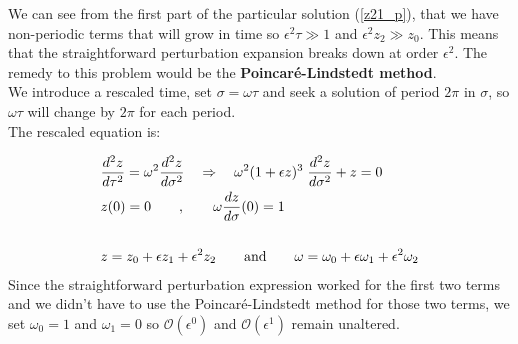 \documentclass[a4paper,10pt]{article}
\begin{document}
We can see from the first part of the particular solution (\ref{z21_p}), that we have non-periodic terms that will grow in time so $\epsilon^2 \tau \gg 1$ and $\epsilon^2 z_2 \gg z_0$. This means that the straightforward perturbation expansion breaks down at order $\epsilon^2$. The remedy to this problem would be the \textbf{Poincaré-Lindstedt method}.\\
\vspace{4mm}
We introduce a rescaled time, set $\sigma = \omega \tau$ and seek a solution of period $2 \pi$ in $\sigma$, so $\omega \tau$ will change by $2 \pi$ for each period.\\
\newpage
The rescaled equation is:

\begin{align}
&\frac{d^2 z}{d \tau^2} = \omega^2 \frac{d^2 z}{d \sigma^2} \quad \Rightarrow \quad \omega^2(1 + \epsilon z)^3 \hspace{1mm} \frac{d^2 z}{d \sigma^2} + z = 0 \label{rescaled_eq}\\
&z(0) = 0 \qquad , \qquad \omega \frac{d z}{d \sigma}(0) = 1 \label{IC}\\ \nonumber \\
&z = z_0 + \epsilon z_1 + \epsilon^2 z_2 \qquad \text{and} \qquad \omega = \omega_0 + \epsilon \omega_1 + \epsilon^2 \omega_2 \nonumber
\end{align}
Since the straightforward perturbation expression worked for the first two terms and we didn't have to use the Poincaré-Lindstedt method for those two terms, we set $\omega_0 = 1$ and $\omega_1 = 0$ so $\mathcal{O}(\epsilon^0)$ and $\mathcal{O}(\epsilon^1)$ remain unaltered.
\end{document}
